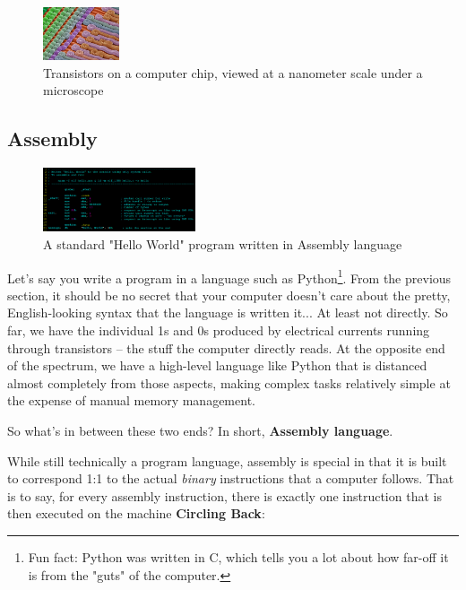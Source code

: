 \documentclass[a4paper,11pt]{article}
\begin{document}
\begin{figure}[h]
    \centering
    \includegraphics[width=0.2\textwidth]{images/microscope_chip.jpg}
    \caption{Transistors on a computer chip, viewed at a nanometer scale under a microscope}
\end{figure}

\newpage

\subsection{Assembly}

\begin{figure}[h]
    \centering
    \includegraphics[width=0.4\textwidth]{images/assembly.png}
    \caption{A standard "Hello World" program written in Assembly language}
\end{figure}

Let's say you write a program in a language such as Python\footnote[2]{Fun fact: Python was written in C, which tells you a lot about how far-off it is from the "guts" of the computer.}. From the previous section, it should be no secret that your computer doesn't care about the pretty, English-looking syntax that the language is written it... At least not directly.
\newline
\newline
So far, we have the individual 1s and 0s produced by electrical currents running through transistors -- the stuff the computer directly reads. At the opposite end of the spectrum, we have a high-level language like Python that is distanced almost completely from those aspects, making complex tasks relatively simple at the expense of manual memory management.
\newline
\begin{center}
So what's in between these two ends? In short, {\bfseries Assembly language}.
\end{center}
\vspace{0.5cm}
While still technically a program language, assembly is special in that it is built to correspond 1:1 to the actual \textit{binary} instructions that a computer follows. That is to say, for every assembly instruction, there is exactly one instruction that is then executed on the machine
\newline
\newline
{\bfseries Circling Back}:
\end{document}
